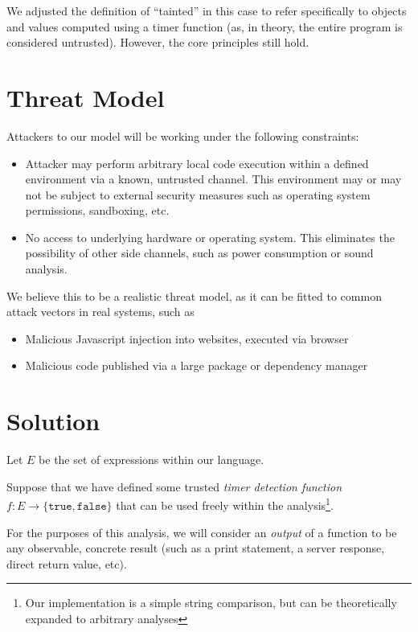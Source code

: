 \documentclass[12pt]{article}
\begin{document}
\begin{multicols*}{2}
  We adjusted the definition of ``tainted'' in this case to refer specifically
  to objects and values computed using a timer function (as, in theory, the
  entire program is considered untrusted). However, the core principles still
  hold.

  \section{Threat Model}

  Attackers to our model will be working under the following constraints:

  \begin{itemize}
    \item Attacker may perform arbitrary local code execution within a defined
      environment via a known, untrusted channel. This environment may or may
      not be subject to external security measures such as operating system
      permissions, sandboxing, etc.
    \item No access to underlying hardware or operating system. This eliminates
      the possibility of other side channels, such as power consumption or
      sound analysis.
  \end{itemize}

  We believe this to be a realistic threat model, as it can be fitted to
  common attack vectors in real systems, such as

  \begin{itemize}
    \item Malicious Javascript injection into websites, executed via browser
    \item Malicious code published via a large package or dependency manager
  \end{itemize}

  \section{Solution}

  Let $E$ be the set of expressions within our language.

  Suppose that we have defined some trusted \textit{timer detection function}
  $f: E \rightarrow \{\texttt{true}, \texttt{false}\}$ that can be used freely
  within the analysis\footnote{Our implementation is a simple string
  comparison, but can be theoretically expanded to arbitrary analyses}.

  For the purposes of this analysis, we will consider an \textit{output} of a
  function to be any observable, concrete result (such as a print statement,
  a server response, direct return value, etc).


\end{multicols*}
\end{document}
